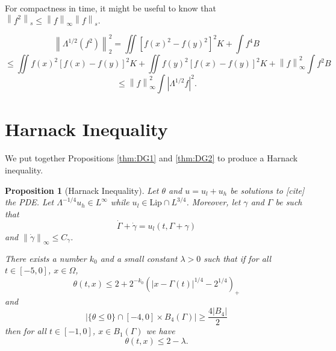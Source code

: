 \documentclass[11pt]{amsart}
\newtheorem{proposition}[theorem]{Proposition}
\theoremstyle{remark}
\theoremstyle{definition}
\newcommand{\norm}[1]{\left\lVert#1\right\rVert}
\newcommand{\paren}[1]{\left( #1 \right)}
\newcommand{\abs}[1]{\left\lvert #1 \right\rvert}
\newcommand{\Lip}{\text{Lip}}
\newcommand{\ulow}{u_l}
\newcommand{\uhigh}{u_h}
\begin{document}
For compactness in time, it might be useful to know that $\norm{f^2}_s \leq \norm{f}_\infty \norm{f}_s$.  

\[ \norm{\Lambda^{1/2}(f^2)}_2^2 = \iint [f(x)^2 - f(y)^2]^2 K + \int f^4 B \]
\[ \leq \iint f(x)^2 [f(x)-f(y)]^2 K + \iint f(y)^2[f(x)-f(y)]^2 K + \norm{f}_\infty^2 \int f^2 B \]
\[ \leq \norm{f}_\infty^2 \int |\Lambda^{1/2} f|^2. \]



\section{Harnack Inequality}

We put together Propositions \ref{thm:DG1} and \ref{thm:DG2} to produce a Harnack inequality.  

\begin{proposition}[Harnack Inequality] \label{thm:harnack general}
Let $\theta$ and $u = \ulow + \uhigh$ be solutions to [cite] the PDE.  Let $\Lambda^{-1/4} \uhigh \in L^\infty$ while $\ulow \in \Lip \cap L^{3/4}$.  Moreover, let $\gamma$ and $\Gamma$ be such that
\[ \dot{\Gamma} + \dot{\gamma} = \ulow(t,\Gamma+\gamma) \]
and $\norm{\dot{\gamma}}_\infty \leq C_\gamma$. 

There exists a number $k_0$ and a small constant $\lambda>0$ such that if for all $t \in [-5,0]$, $x \in \Omega$,
\[ \theta(t,x) \leq 2 + 2^{-k_0} \paren{|x-\Gamma(t)|^{1/4}-2^{1/4}}_+ \]
and
\[ \abs{\{\theta \leq 0\} \cap [-4,0]\times B_4(\Gamma)} \geq \frac{4|B_4|}{2} \]
then for all $t \in [-1,0]$, $x \in B_1(\Gamma)$ we have
\[ \theta(t,x) \leq 2 - \lambda. \]
\end{proposition}
\end{document}
